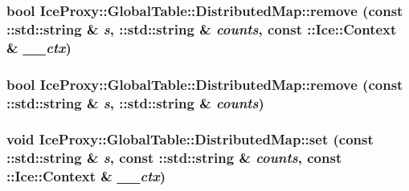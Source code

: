 \label{class_ice_proxy_1_1_global_table_1_1_distributed_map_a2f7fd37f656e343b2562b0976203a040}
\hypertarget{class_ice_proxy_1_1_global_table_1_1_distributed_map_a69aa492b23c94fceb48cddfba3b79918}{
\subsubsection[{remove}]{\setlength{\rightskip}{0pt plus 5cm}bool IceProxy::GlobalTable::DistributedMap::remove (const ::std::string \& {\em s}, \/  ::std::string \& {\em counts}, \/  const ::Ice::Context \& {\em \_\-\_\-ctx})}}
\label{class_ice_proxy_1_1_global_table_1_1_distributed_map_a69aa492b23c94fceb48cddfba3b79918}
\hypertarget{class_ice_proxy_1_1_global_table_1_1_distributed_map_a8a88c46caccec89eb51ad36ca88f6e48}{
\subsubsection[{remove}]{\setlength{\rightskip}{0pt plus 5cm}bool IceProxy::GlobalTable::DistributedMap::remove (const ::std::string \& {\em s}, \/  ::std::string \& {\em counts})}}
\label{class_ice_proxy_1_1_global_table_1_1_distributed_map_a8a88c46caccec89eb51ad36ca88f6e48}
\hypertarget{class_ice_proxy_1_1_global_table_1_1_distributed_map_a7c9e7642cc48a4a0092d18533cd1ef14}{
\subsubsection[{set}]{\setlength{\rightskip}{0pt plus 5cm}void IceProxy::GlobalTable::DistributedMap::set (const ::std::string \& {\em s}, \/  const ::std::string \& {\em counts}, \/  const ::Ice::Context \& {\em \_\-\_\-ctx})}}
\label{class_ice_proxy_1_1_global_table_1_1_distributed_map_a7c9e7642cc48a4a0092d18533cd1ef14}
